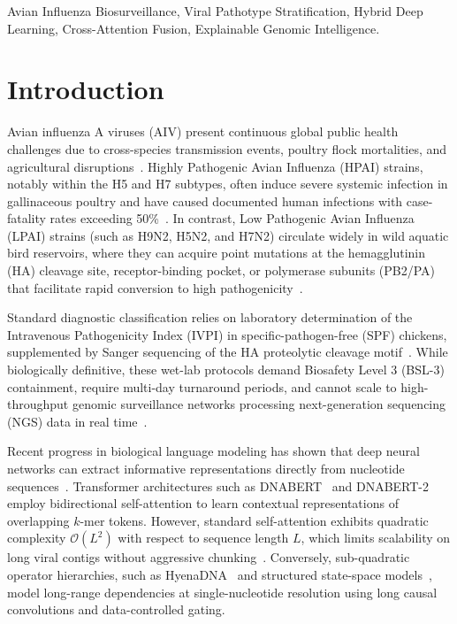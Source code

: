 \documentclass[conference]{IEEEtran}
\begin{document}
\begin{IEEEkeywords}
Avian Influenza Biosurveillance, Viral Pathotype Stratification, Hybrid Deep Learning, Cross-Attention Fusion, Explainable Genomic Intelligence.
\end{IEEEkeywords}

\section{Introduction}
\label{sec:introduction}

Avian influenza A viruses (AIV) present continuous global public health challenges due to cross-species transmission events, poultry flock mortalities, and agricultural disruptions~\cite{who2024avianflu, naeem2022hpai}. Highly Pathogenic Avian Influenza (HPAI) strains, notably within the H5 and H7 subtypes, often induce severe systemic infection in gallinaceous poultry and have caused documented human infections with case-fatality rates exceeding 50\%~\cite{subbarao1998h5n1, cheung2007pathogenicity, soda2022influenza}. In contrast, Low Pathogenic Avian Influenza (LPAI) strains (such as H9N2, H5N2, and H7N2) circulate widely in wild aquatic bird reservoirs, where they can acquire point mutations at the hemagglutinin (HA) cleavage site, receptor-binding pocket, or polymerase subunits (PB2/PA) that facilitate rapid conversion to high pathogenicity~\cite{influenza2010pandemic}.

Standard diagnostic classification relies on laboratory determination of the Intravenous Pathogenicity Index (IVPI) in specific-pathogen-free (SPF) chickens, supplemented by Sanger sequencing of the HA proteolytic cleavage motif~\cite{soda2022influenza}. While biologically definitive, these wet-lab protocols demand Biosafety Level 3 (BSL-3) containment, require multi-day turnaround periods, and cannot scale to high-throughput genomic surveillance networks processing next-generation sequencing (NGS) data in real time~\cite{libbrecht2015ml}.

Recent progress in biological language modeling has shown that deep neural networks can extract informative representations directly from nucleotide sequences~\cite{ji2021dnabert, zhou2023dnabert2, nguyen2023hyenadna}. Transformer architectures such as DNABERT~\cite{ji2021dnabert} and DNABERT-2~\cite{zhou2023dnabert2} employ bidirectional self-attention to learn contextual representations of overlapping $k$-mer tokens. However, standard self-attention exhibits quadratic complexity $\mathcal{O}(L^2)$ with respect to sequence length $L$, which limits scalability on long viral contigs without aggressive chunking~\cite{vaswani2017attention, chen2020bigbird}. Conversely, sub-quadratic operator hierarchies, such as HyenaDNA~\cite{nguyen2023hyenadna} and structured state-space models~\cite{gu2021mamba, poli2023hyena}, model long-range dependencies at single-nucleotide resolution using long causal convolutions and data-controlled gating.
\end{document}
